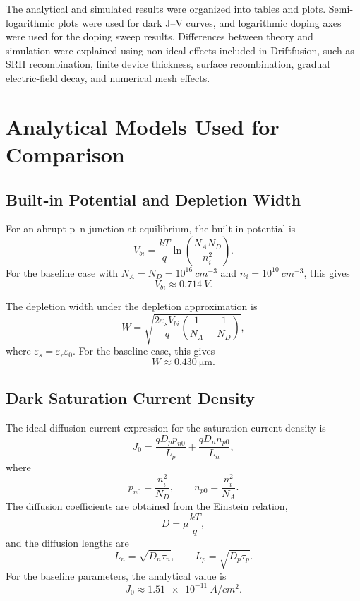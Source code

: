 \documentclass[11pt,a4paper]{article}
\newcommand{\jzero}{J_0}
\newcommand{\vbi}{V_{bi}}
\newcommand{\Na}{N_A}
\newcommand{\Nd}{N_D}
\newcommand{\um}{\si{\micro\meter}}
\begin{document}
The analytical and simulated results were organized into tables and plots. Semi-logarithmic plots were used for dark J--V curves, and logarithmic doping axes were used for the doping sweep results. Differences between theory and simulation were explained using non-ideal effects included in Driftfusion, such as SRH recombination, finite device thickness, surface recombination, gradual electric-field decay, and numerical mesh effects.
\section{Analytical Models Used for Comparison}

\subsection{Built-in Potential and Depletion Width}

For an abrupt p--n junction at equilibrium, the built-in potential is
\begin{equation}
    \vbi = \frac{kT}{q}\ln\left(\frac{\Na\Nd}{n_i^2}\right).
    \label{eq:vbi}
\end{equation}
For the baseline case with $\Na=\Nd=10^{16}\ \si{cm^{-3}}$ and $n_i=10^{10}\ \si{cm^{-3}}$, this gives
\[
    \vbi \approx \SI{0.714}{V}.
\]

The depletion width under the depletion approximation is
\begin{equation}
    W = \sqrt{\frac{2\varepsilon_s \vbi}{q}\left(\frac{1}{\Na}+\frac{1}{\Nd}\right)},
    \label{eq:depletion_width}
\end{equation}
where $\varepsilon_s=\varepsilon_r\varepsilon_0$. For the baseline case, this gives
\[
    W \approx \SI{0.430}{\um}.
\]

\subsection{Dark Saturation Current Density}

The ideal diffusion-current expression for the saturation current density is
\begin{equation}
    \jzero = \frac{qD_p p_{n0}}{L_p} + \frac{qD_n n_{p0}}{L_n},
    \label{eq:j0}
\end{equation}
where
\begin{equation}
    p_{n0}=\frac{n_i^2}{\Nd}, \qquad n_{p0}=\frac{n_i^2}{\Na}.
    \label{eq:minority_concentration}
\end{equation}
The diffusion coefficients are obtained from the Einstein relation,
\begin{equation}
    D = \mu \frac{kT}{q},
\end{equation}
and the diffusion lengths are
\begin{equation}
    L_n=\sqrt{D_n\tau_n}, \qquad L_p=\sqrt{D_p\tau_p}.
\end{equation}
For the baseline parameters, the analytical value is
\[
    \jzero \approx \SI{1.51e-11}{A/cm^2}.
\]
\end{document}
